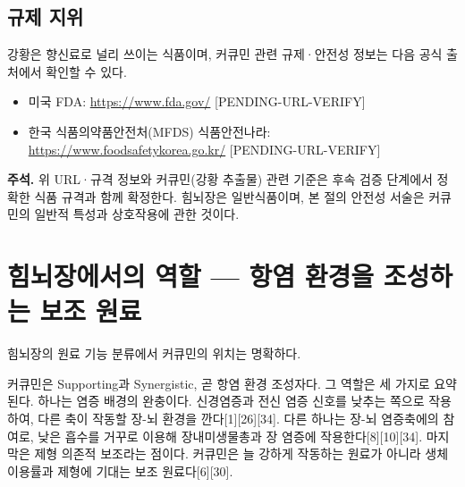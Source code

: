 \documentclass[12pt,oneside]{book}
\newenvironment{authnote}
  {\par\smallskip\begingroup\leftskip=6mm\rightskip=3mm\small\color{muted}\noindent\ignorespaces}
  {\par\endgroup\smallskip}
\begin{document}
\subsection{규제 지위}

강황은 향신료로 널리 쓰이는 식품이며, 커큐민 관련 규제·안전성 정보는 다음 공식 출처에서 확인할 수 있다.

\begin{itemize}[leftmargin=6mm,itemsep=1pt,topsep=2pt]
  \item 미국 FDA: \url{https://www.fda.gov/} [PENDING-URL-VERIFY]
  \item 한국 식품의약품안전처(MFDS) 식품안전나라: \url{https://www.foodsafetykorea.go.kr/} [PENDING-URL-VERIFY]
\end{itemize}

\begin{authnote}\textbf{주석.} 위 URL·규격 정보와 커큐민(강황 추출물) 관련 기준은 후속 검증 단계에서 정확한 식품 규격과 함께 확정한다. 힘뇌장은 일반식품이며, 본 절의 안전성 서술은 커큐민의 일반적 특성과 상호작용에 관한 것이다.\end{authnote}

\section{힘뇌장에서의 역할 — 항염 환경을 조성하는 보조 원료}

힘뇌장의 원료 기능 분류에서 커큐민의 위치는 명확하다.

\vspace{2pt}\vspace{3pt}

커큐민은 Supporting과 Synergistic, 곧 항염 환경 조성자다. 그 역할은 세 가지로 요약된다. 하나는 염증 배경의 완충이다. 신경염증과 전신 염증 신호를 낮추는 쪽으로 작용하여, 다른 축이 작동할 장-뇌 환경을 깐다[1][26][34]. 다른 하나는 장-뇌 염증축에의 참여로, 낮은 흡수를 거꾸로 이용해 장내미생물총과 장 염증에 작용한다[8][10][34]. 마지막은 제형 의존적 보조라는 점이다. 커큐민은 늘 강하게 작동하는 원료가 아니라 생체이용률과 제형에 기대는 보조 원료다[6][30].
\end{document}

